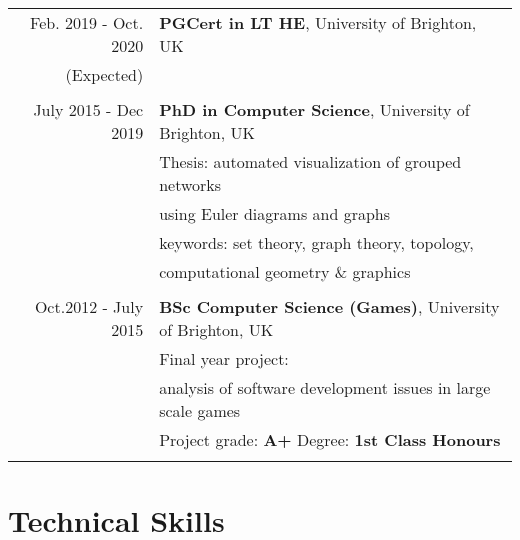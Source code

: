 \documentclass[a4paper,11pt]{article} %
\begin{document}
\begin{tabular}{r|p{11cm}}

Feb. 2019 - Oct. 2020 & \textbf{PGCert in LT HE}, University of Brighton, UK\\
(Expected)&\\
\multicolumn{2}{c}{} \\


July 2015 - Dec 2019 & \textbf{PhD in Computer Science}, University of Brighton, UK\\
& Thesis: automated visualization of grouped networks\\
& using Euler diagrams and graphs\\
& keywords: set theory, graph theory, topology,\\
& computational geometry \& graphics \\
\multicolumn{2}{c}{} \\

	
Oct.2012 - July 2015 & \textbf{BSc Computer Science (Games)}, University of Brighton, UK\\
& Final year project: \\
& analysis of software development issues in large scale games\\
&\normalsize Project grade: \textbf{A+} Degree: \textbf{1st Class Honours} \\
\multicolumn{2}{c}{} \\

\end{tabular}



\section{Technical Skills}
\end{document}
